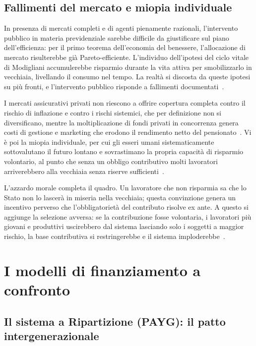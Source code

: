 \subsection{Fallimenti del mercato e miopia individuale}

In presenza di mercati completi e di agenti pienamente razionali, l'intervento pubblico in materia previdenziale sarebbe difficile da giustificare sul piano dell'efficienza: per il primo teorema dell'economia del benessere, l'allocazione di mercato risulterebbe già Pareto-efficiente. L'individuo dell'ipotesi del ciclo vitale di Modigliani accumulerebbe risparmio durante la vita attiva per smobilizzarlo in vecchiaia, livellando il consumo nel tempo. La realtà si discosta da queste ipotesi su più fronti, e l'intervento pubblico risponde a fallimenti documentati~\cite{Bosi2018}.

I mercati assicurativi privati non riescono a offrire copertura completa contro il rischio di inflazione e contro i rischi sistemici, che per definizione non si diversificano, mentre la moltiplicazione di fondi privati in concorrenza genera costi di gestione e marketing che erodono il rendimento netto del pensionato~\cite{RosenGayerRapallini2023}. Vi è poi la miopia individuale, per cui gli esseri umani sistematicamente sottovalutano il futuro lontano e sovrastimano la propria capacità di risparmio volontario, al punto che senza un obbligo contributivo molti lavoratori arriverebbero alla vecchiaia senza riserve sufficienti~\cite{RosenGayerRapallini2023}.

L'azzardo morale completa il quadro. Un lavoratore che non risparmia sa che lo Stato non lo lascerà in miseria nella vecchiaia; questa convinzione genera un incentivo perverso che l'obbligatorietà del contributo risolve ex ante. A questo si aggiunge la selezione avversa: se la contribuzione fosse volontaria, i lavoratori più giovani e produttivi uscirebbero dal sistema lasciando solo i soggetti a maggior rischio, la base contributiva si restringerebbe e il sistema imploderebbe~\cite{RosenGayerRapallini2023}.

\section{I modelli di finanziamento a confronto}

\subsection{Il sistema a Ripartizione (PAYG): il patto intergenerazionale}

